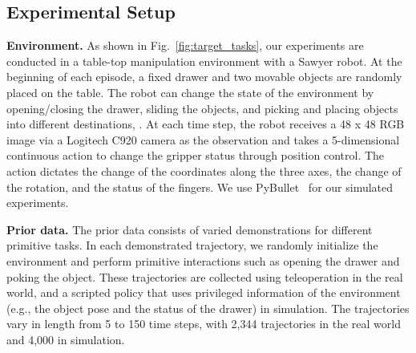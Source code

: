 
\subsection{Experimental Setup}
\label{sec:experimental_setup}


\textbf{Environment.}
As shown in Fig.~\ref{fig:target_tasks}, our experiments are conducted in a table-top manipulation environment with a Sawyer robot. At the beginning of each episode, a fixed drawer and two movable objects are randomly placed on the table. The robot can change the state of the environment by opening/closing the drawer, sliding the objects, and picking and placing objects into different destinations, \etc. At each time step, the robot receives a 48 x 48 RGB image via a Logitech C920 camera as the observation and takes a 5-dimensional continuous action to change the gripper status through position control. The action dictates the change of the coordinates along the three axes, the change of the rotation, and the status of the fingers. We use PyBullet~\cite{coumans2021} for our simulated experiments.  


\textbf{Prior data.}
The prior data consists of varied demonstrations for different primitive tasks. In each demonstrated trajectory, we randomly initialize the environment and perform primitive interactions such as opening the drawer and poking the object. These trajectories are collected using teleoperation in the real world, and a scripted policy that uses privileged information of the environment (e.g., the object pose and the status of the drawer) in simulation. The trajectories vary in length from 5 to 150 time steps, with 2,344 trajectories in the real world and 4,000 in simulation.

